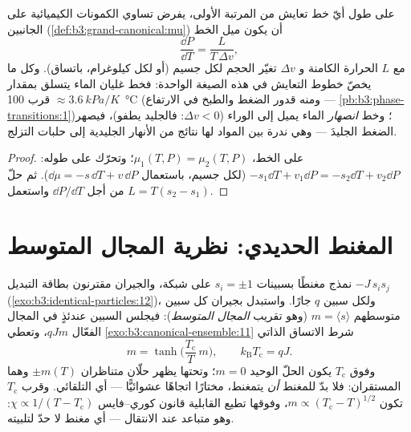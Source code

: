 \begin{proposition}\label{prop:b3:phase-transitions:clapeyron}
على طول أيّ خط تعايش من المرتبة الأولى، يفرض تساوي الكمونات
الكيميائية على الجانبين
(\cref{def:b3:grand-canonical:mu}) أن يكون ميل الخط
\[
\frac{\dd P}{\dd T} = \frac{L}{T\,\Delta v} ,
\]
مع $L$ الحرارة الكامنة و $\Delta v$ تغيّر الحجم لكل
جسيم (أو لكل كيلوغرام، باتساق). وكل ما يخصّ
خطوط التعايش في هذه الصيغة الواحدة: فخط غليان الماء
يتسلق بمقدار $\approx\qty{3.6}{kPa/K}$ قرب \qty{100}{\celsius}
(ومنه قدور الضغط والطبخ في الارتفاع ---
\cref{pb:b3:phase-transitions:1})؛ وخط \emph{انصهار} الماء
يميل إلى الوراء ($\Delta v < 0$: فالجليد يطفو)، فيصهر الضغط
الجليدَ --- وهي ندرة بين المواد لها نتائج من الأنهار الجليدية
إلى حلبات التزلج.
\end{proposition}

\begin{proof}
على الخط، $\mu_1(T, P) = \mu_2(T, P)$؛ وتحرّك على طوله:
$-s_1\dd T + v_1\dd P = -s_2\dd T + v_2\dd P$ (لكل جسيم، باستعمال
$\dd\mu = -s\,\dd T + v\,\dd P$). ثم حلّ من أجل $\dd P/\dd T$ واستعمل
$L = T(s_2 - s_1)$.
\end{proof}

\section{المغنط الحديدي: نظرية المجال المتوسط}

\begin{theorem}\label{thm:b3:phase-transitions:meanfield}
نمذج مغنطًا بسبينات $s_i = \pm1$ على شبكة، والجيران
مقترنون بطاقة التبديل $-J\,s_is_j$
(\cref{exo:b3:identical-particles:12})، ولكل سبين $q$
جارًا. واستبدل بجيران كل سبين متوسطهم $m =
\langle s\rangle$ (وهو تقريب \emph{المجال المتوسط}): فيجلس السبين
عندئذٍ في المجال الفعّال $qJm$، وتعطي
\cref{exo:b3:canonical-ensemble:11} شرط
الاتساق الذاتي
\[
m = \tanh\!\Big(\frac{T_{\text{c}}}{T}\,m\Big) , \qquad
k_{\text{B}}T_{\text{c}} = qJ .
\]
وفوق $T_{\text{c}}$ يكون الحلّ الوحيد $m = 0$؛ وتحتها يظهر حلّان
متناظران $\pm m(T)$ وهما المستقران: فلا بدّ للمغنط \emph{أن}
يتمغنط، مختارًا اتجاهًا عشوائيًّا ---
أي  التلقائي. وقرب $T_{\text{c}}$ تكون $m \propto
(T_{\text{c}} - T)^{1/2}$، وفوقها تطيع القابلية
قانون كوري--فايس $\chi \propto 1/(T - T_{\text{c}})$:
وهو متباعد عند الانتقال --- أي مغنط لا حدّ لتلبيته.
\end{theorem}


